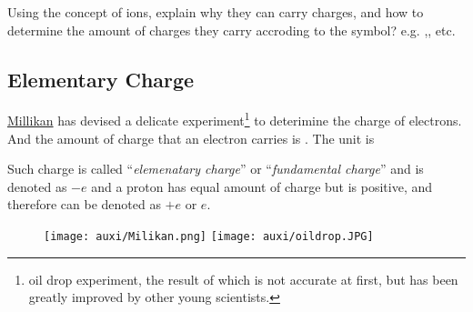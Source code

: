 \documentclass[a4paper]{tufte-handout}
\newenvironment{TaskBox} %
{\begin{tcolorbox}[breakable,colback=b1!30,colframe=b1,title=Task]} {\end{tcolorbox}}
\begin{document}
\begin{TaskBox}
Using the concept of ions, explain why they can carry charges, and how to determine the amount of charges they carry accroding to the symbol? e.g. ,, etc.
\vspace{1in} 
\end{TaskBox}

\subsection{Elementary Charge}
\href{https://owlcation.com/stem/Millikans-Oil-Drop-Experiment#:~:text=Millikan%27s%20oil-drop%20experiment%20was%20performed%20by%20Robert%20Millikan,groups%20%28or%20the%20absence%20of%20groups%29%20of%20electrons.}{Millikan} has devised a delicate experiment\footnote{oil drop experiment, the result of which is not accurate at first, but has been greatly improved by other young scientists.} to deterimine the charge of electrons. And the amount of charge that an electron carries is \uline{\hspace{1in}}. The unit is \uline{\hspace{1in}}

Such charge is called ``\emph{elemenatary charge}'' or ``\emph{fundamental charge}'' and is denoted as $-e$ and a proton has equal amount of charge but is positive, and therefore can be denoted as $+e$ or $e$.

\begin{figure}[h]
\texttt{[image: auxi/Milikan.png]}
\texttt{[image: auxi/oildrop.JPG]}
\end{figure}
\end{document}
